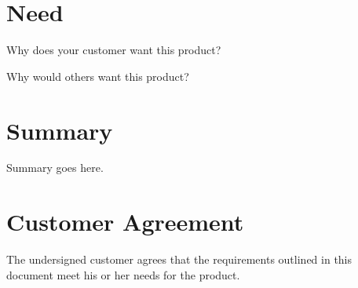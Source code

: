 \documentclass[12pt,letterpaper]{article}
\begin{document}
\section*{Need}

Why does your customer want this product?

Why would others want this product?

\section*{Summary}

Summary goes here.

\newpage
\thispagestyle{empty}
\section*{Customer Agreement}

The undersigned customer agrees that the requirements outlined in this document meet his or her needs for the product.

~\par\vspace{.5in}
\par\noindent\makebox[2.5in]{\hrulefill} \hfill\makebox[2.0in]{\hrulefill}
\par\noindent{} \hfill{}
\end{document}

